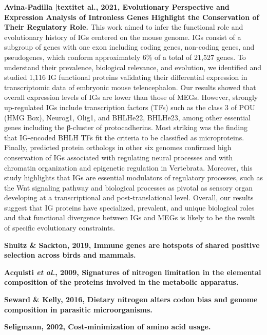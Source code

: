 \documentclass[11pt]{article}
\begin{document}
\begin{sloppypar}
\textbf{Avina-Padilla |textit{et al.}, 2021, Evolutionary Perspective and Expression Analysis of Intronless Genes Highlight the Conservation of Their Regulatory Role.} \newline
This work aimed to infer the functional role and evolutionary history of IGs centered on the mouse genome. IGs consist of a subgroup of genes with one exon including coding genes, non-coding genes, and pseudogenes, which conform approximately 6\% of a total of 21,527 genes. To understand their prevalence, biological relevance, and evolution, we identified and studied 1,116 IG functional proteins validating their differential expression in transcriptomic data of embryonic mouse telencephalon. Our results showed that overall expression levels of IGs are lower than those of MEGs. However, strongly up-regulated IGs include transcription factors (TFs) such as the class 3 of POU (HMG Box), Neurog1, Olig1, and BHLHe22, BHLHe23, among other essential genes including the β-cluster of protocadherins. Most striking was the finding that IG-encoded BHLH TFs fit the criteria to be classified as microproteins. Finally, predicted protein orthologs in other six genomes confirmed high conservation of IGs associated with regulating neural processes and with chromatin organization and epigenetic regulation in Vertebrata. Moreover, this study highlights that IGs are essential modulators of regulatory processes, such as the Wnt signaling pathway and biological processes as pivotal as sensory organ developing at a transcriptional and post-translational level. Overall, our results suggest that IG proteins have specialized, prevalent, and unique biological roles and that functional divergence between IGs and MEGs is likely to be the result of specific evolutionary constraints.
\par
\textbf{Shultz & Sackton, 2019, Immune genes are hotspots of shared positive selection across birds and mammals.} \newline
\par
\textbf{Acquisti \textit{et al.}, 2009, Signatures of nitrogen limitation in the elemental composition of the proteins involved in the metabolic apparatus.} \newline
\par
\textbf{Seward & Kelly, 2016, Dietary nitrogen alters codon bias and genome composition in parasitic microorganisms.} \newline
\par
\textbf{Seligmann, 2002, Cost-minimization of amino acid usage.} \newline

\end{sloppypar}
\end{document}
